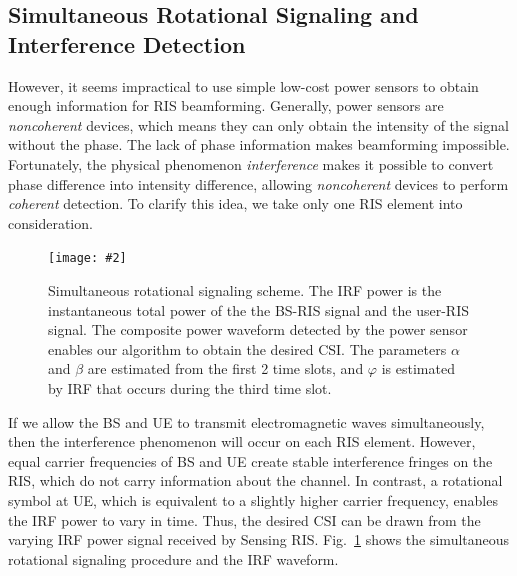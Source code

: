 \documentclass[12pt,draftclsnofoot,journal,onecolumn]{IEEEtran}
\theoremstyle{nonumberplain}
\newcommand{\myincludegraphics}[2][width=12cm]{\texttt{[image: \#2]}}
\begin{document}
\subsection{Simultaneous Rotational Signaling and Interference Detection}
    However, it seems impractical to use simple low-cost power sensors to obtain enough information for RIS beamforming. 
    Generally, power sensors are {\it noncoherent} devices, which means they can only obtain the intensity of the signal without the phase. 
    The lack of phase information makes beamforming impossible. 
    Fortunately, the physical phenomenon {\it interference} makes it possible to convert phase difference into intensity difference, allowing {\it noncoherent} devices to perform {\it coherent} detection. 
    To clarify this idea, we take only one RIS element into consideration.     
    \begin{figure}[!t]
        \centering
        \myincludegraphics{data/protocol.pdf} 
        \caption{Simultaneous rotational signaling scheme. The IRF power is the instantaneous total power of the the BS-RIS signal and the user-RIS signal. The composite power waveform detected by the power sensor enables our algorithm to obtain the desired CSI. The parameters $\alpha$ and $\beta$ are estimated from the first 2 time slots, and $\varphi$ is estimated by IRF that occurs during the third time slot. }
        \label{fig:protocol}
    \end{figure}
    If we allow the BS and UE to transmit electromagnetic waves simultaneously, then the interference phenomenon will occur on each RIS element. 
    However, equal carrier frequencies of BS and UE create stable interference fringes \cite{louradour1993interference} on the RIS, which do not carry information about the channel. 
    In contrast, a rotational symbol at UE, which is equivalent to a slightly higher carrier frequency, enables the IRF power to vary in time. 
    Thus, the desired CSI can be drawn from the varying IRF power signal received by Sensing RIS.
    Fig.~\ref{fig:protocol} shows the simultaneous rotational signaling procedure and the IRF waveform. 
\end{document}
